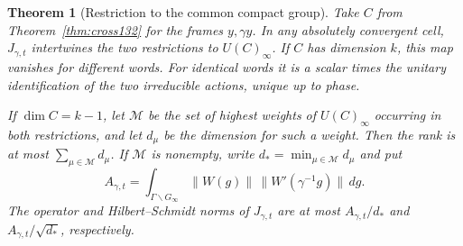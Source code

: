 \documentclass[a4paper,11pt]{article}
\newtheorem{theorem}[proposition]{Theorem}
\theoremstyle{definition}
\theoremstyle{remark}
\numberwithin{equation}{section}
\begin{document}
\begin{theorem}[Restriction to the common compact group]
\leavevmode\label{thm:common133}
Take \(C\) from Theorem~\ref{thm:cross132} for the frames
\(y,\gamma y\). In any absolutely convergent cell, \(J_{\gamma,t}\)
intertwines the two restrictions to \(U(C)_\infty\). If \(C\)
has dimension \(k\), this map vanishes for different words. For
identical words it is a scalar times the unitary identification
of the two irreducible actions, unique up to phase.

If \(\dim C=k-1\), let \(\mathcal M\) be the set of highest weights
of \(U(C)_\infty\) occurring in both restrictions, and let
\(d_\mu\) be the dimension for such a weight. Then the rank
is at most \(\sum_{\mu\in\mathcal M}d_\mu\).
If \(\mathcal M\) is nonempty, write \(d_*=\min_{\mu\in\mathcal M}d_\mu\)
and put
\[
   A_{\gamma,t}=\int_{\Gamma\backslash G_\infty}
                       \|W(g)\|\,\|W'(\gamma^{-1}g)\|\,dg .
\]
The operator and Hilbert--Schmidt norms of \(J_{\gamma,t}\) are at
most \(A_{\gamma,t}/d_*\) and \(A_{\gamma,t}/\sqrt{d_*}\),
respectively.
\end{theorem}
\end{document}
